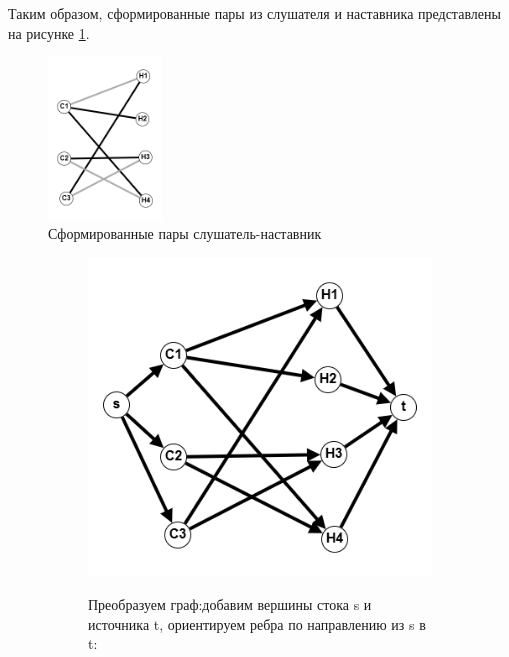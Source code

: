 \documentclass{article}
\begin{document}
\begin{enumerate}
\\
\\
Таким образом, сформированные пары из слушателя и наставника представлены на рисунке \ref{fig:12_res_pairs}.
\begin{figure}[ht]
    \includegraphics[width=0.27\textwidth, center]{attachments/12/12_pairs.png}
    \caption{Сформированные пары слушатель-наставник}
    \label{fig:12_res_pairs}
\end{figure}
\begin{figure}
     \centering
     \begin{subfigure}[b]{0.35\textwidth}
        \centering
         \caption*{Преобразуем граф:добавим вершины стока s и источника t,  ориентируем ребра по направлению из s в t:}
         \includegraphics[width=\textwidth]{attachments/12/0.png}
         \label{fig:12_0}
     \end{subfigure}
     \hfill
     \begin{subfigure}[b]{0.35\textwidth}

\end{subfigure}
\end{figure}
\end{enumerate}
\end{document}
